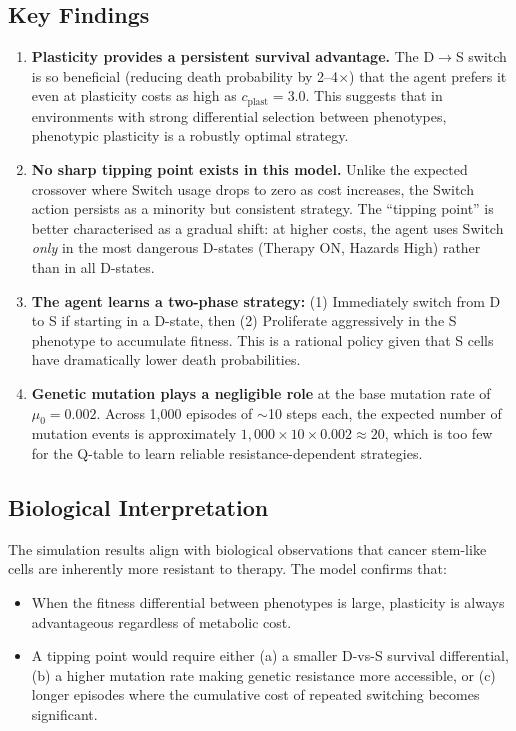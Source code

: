 \documentclass[12pt,a4paper]{article}
\begin{document}
\subsection{Key Findings}

\begin{enumerate}
    \item \textbf{Plasticity provides a persistent survival advantage.} The D$\to$S switch is so beneficial (reducing death probability by 2--4$\times$) that the agent prefers it even at plasticity costs as high as $c_{\text{plast}} = 3.0$. This suggests that in environments with strong differential selection between phenotypes, phenotypic plasticity is a robustly optimal strategy.

    \item \textbf{No sharp tipping point exists in this model.} Unlike the expected crossover where Switch usage drops to zero as cost increases, the Switch action persists as a minority but consistent strategy. The ``tipping point'' is better characterised as a gradual shift: at higher costs, the agent uses Switch \emph{only} in the most dangerous D-states (Therapy ON, Hazards High) rather than in all D-states.

    \item \textbf{The agent learns a two-phase strategy:} (1) Immediately switch from D to S if starting in a D-state, then (2) Proliferate aggressively in the S phenotype to accumulate fitness. This is a rational policy given that S cells have dramatically lower death probabilities.

    \item \textbf{Genetic mutation plays a negligible role} at the base mutation rate of $\mu_0 = 0.002$. Across 1{,}000 episodes of $\sim$10 steps each, the expected number of mutation events is approximately $1{,}000 \times 10 \times 0.002 \approx 20$, which is too few for the Q-table to learn reliable resistance-dependent strategies.
\end{enumerate}

\subsection{Biological Interpretation}

The simulation results align with biological observations that cancer stem-like cells are inherently more resistant to therapy. The model confirms that:
\begin{itemize}[nosep]
    \item When the fitness differential between phenotypes is large, plasticity is always advantageous regardless of metabolic cost.
    \item A tipping point would require either (a) a smaller D-vs-S survival differential, (b) a higher mutation rate making genetic resistance more accessible, or (c) longer episodes where the cumulative cost of repeated switching becomes significant.
\end{itemize}
\end{document}
